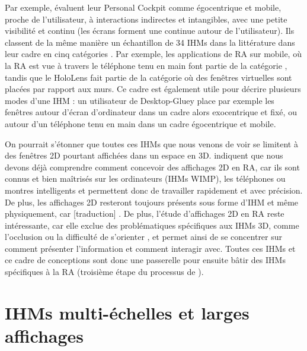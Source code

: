 Par exemple, \cite{Ens2014a} évaluent leur Personal Cockpit comme égocentrique et mobile, proche de l'utilisateur, à interactions indirectes et intangibles, avec une petite visibilité et continu (les écrans forment une  continue autour de l'utilisateur). Ils classent de la même manière un échantillon de 34 IHMs dans la littérature dans leur cadre en cinq catégories . Par exemple, les applications de RA sur mobile, où la RA est vue à travers le téléphone tenu en main font partie de la catégorie , tandis que le HoloLens fait partie de la catégorie  où des fenêtres virtuelles sont placées par rapport aux murs. Ce cadre est également utile pour décrire plusieurs modes d'une IHM : un utilisateur de Desktop-Gluey place par exemple les fenêtres autour d'écran d'ordinateur dans un cadre alors exocentrique et fixé, ou autour d'un téléphone tenu en main dans un cadre égocentrique et mobile.


On pourrait s'étonner que toutes ces IHMs que nous venons de voir se limitent à des fenêtres 2D pourtant affichées dans un espace en 3D. \cite{Ens2014a} indiquent que nous devons déjà comprendre comment concevoir des affichages 2D en RA, car ils sont connus et bien maîtrisés sur les ordinateurs (IHMs WIMP), les téléphones ou montres intelligents et permettent donc de travailler rapidement et avec précision. De plus, les affichages 2D resteront toujours présents sous forme d'IHM et même physiquement, car [traduction]  \citep{Ens2014a}. De plus, l'étude d'affichages 2D en RA reste intéressante, car elle exclue des problématiques spécifiques aux IHMs 3D, comme l'occlusion ou la difficulté de s'orienter \citep{Berge2014}, et permet ainsi de se concentrer sur comment présenter l'information et comment interagir avec. Toutes ces IHMs et ce cadre de conceptions sont donc une passerelle pour ensuite bâtir des IHMs spécifiques à la RA (troisième étape du processus de \cite{Billinghurst2005}).


\section{IHMs multi-échelles et larges affichages}
\label{sec:litterature_multiscale_displays}

